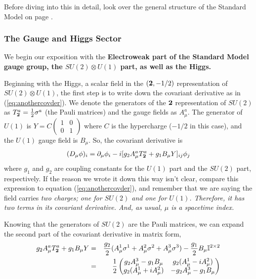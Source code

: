 \documentclass[12pt,epsf]{article}
\def\nolabel{\nonumber }
\def\nolabel{\nonumber }
\begin{document}
Before diving into this in detail, look over the general structure of
the Standard Model on page \pageref{standardmodelsummary}.  

\subsubsection{The Gauge and Higgs Sector}

We begin our exposition with the \bf Electroweak \rm part of the
Standard Model gauge group, the $SU(2)\otimes U(1)$ part, as well as
the Higgs.  

Beginning with the Higgs, a scalar field in the $(\bf 2\rm, -1/2)$
representation of $SU(2)\otimes U(1)$, the first step is to write down
the covariant derivative as in (\ref{eq:anothercovder}).  We denote the
generators of the $\bf 2\rm$ representation of $SU(2)$ as $T^a_{\bf
2\rm} = {1\over 2} \sigma^a$ (the Pauli matrices) and the gauge fields
as $A^a_{\mu}$.  The generator of $U(1)$ is $Y=C\begin{pmatrix} 1 & 0
\\ 0 & 1 \end{pmatrix}$ where $C$ is the hypercharge ($-1/2$ in this
case), and the $U(1)$ gauge field is $B_{\mu}$.  So, the covariant
derivative is
\begin{eqnarray}
(D_{\mu} \phi)_i = \partial_{\mu}\phi_i - i[g_2A^a_{\mu}T^a_{\bf 2\rm}
+ g_1 B_{\mu}Y]_{ij}\phi_j \label{eq:asdfasdf}
\end{eqnarray}
where $g_1$ and $g_2$ are coupling constants for the $U(1)$ part and
the $SU(2)$ part, respectively.  If the reason we wrote it down this
way isn't clear, compare this expression to equation
(\ref{eq:anothercovder}), and remember that we are saying the field
carries \it two \rm charges; one for $SU(2)$ and one for $U(1)$. 
Therefore, it has two terms in its covariant derivative.  And, as
usual, $\mu$ is a spacetime index.  

Knowing that the generators of $SU(2)$ are the Pauli matrices, we can
expand the second part of the covariant derivative in matrix form,
\begin{eqnarray}
g_2A^a_{\mu}T^a_{\bf 2\rm}+g_1B_{\mu}Y &=& {g_2 \over
2}(A^1_{\mu}\sigma^1 + A^2_{\mu}\sigma^2 + A^3_{\mu}\sigma^3) -
{g_1\over 2}B_{\mu}\mathbb{I}^{2\times 2} \nolabel \\
&=& {1\over 2} 
\begin{pmatrix}
g_2A^3_{\mu} - g_1B_{\mu} & g_2(A^1_{\mu} - iA^2_{\mu}) \\
g_2(A^1_{\mu}+iA^2_{\mu}) & -g_2A^3_{\mu} - g_1B_{\mu}
\end{pmatrix}\nolabel
\end{eqnarray}
\end{document}
